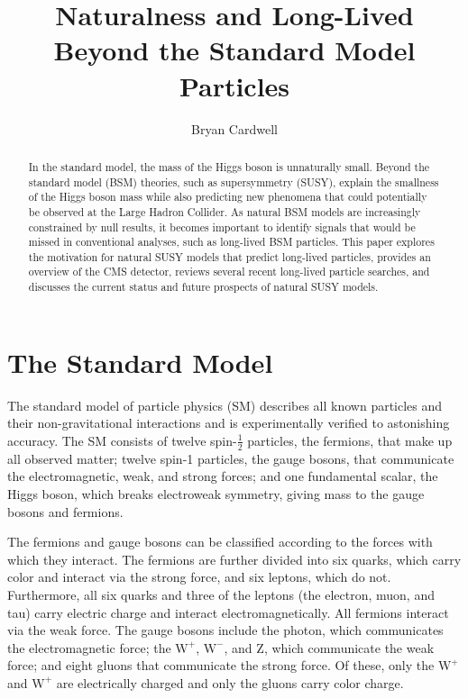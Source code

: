 \documentclass[12pt]{article}
\title{Naturalness and Long-Lived Beyond the Standard Model Particles}
\author{Bryan Cardwell}
\begin{document}
\singlespacing
\maketitle

\begin{abstract}
    In the standard model, the mass of the Higgs boson is unnaturally small. Beyond the standard model (BSM) theories, such as supersymmetry (SUSY), explain the smallness of the Higgs boson mass while also predicting new phenomena that could potentially be observed at the Large Hadron Collider. As natural BSM models are increasingly constrained by null results, it becomes important to identify signals that would be missed in conventional analyses, such as long-lived BSM particles. This paper explores the motivation for natural SUSY models that predict long-lived particles, provides an overview of the CMS detector, reviews several recent long-lived particle searches, and discusses the current status and future prospects of natural SUSY models.

\end{abstract}

\newpage
\tableofcontents
\newpage
\doublespacing
{}

\section{The Standard Model} \label{SM}
    The standard model of particle physics (SM) describes all known particles and their non-gravitational interactions and is experimentally verified to astonishing accuracy. The SM consists of twelve spin-$\frac{1}{2}$ particles, the fermions, that make up all observed matter; twelve spin-1 particles, the gauge bosons, that communicate the electromagnetic, weak, and strong forces; and one fundamental scalar, the Higgs boson, which breaks electroweak symmetry, giving mass to the gauge bosons and fermions.

    The fermions and gauge bosons can be classified according to the forces with which they interact. The fermions are further divided into six quarks, which carry color and interact via the strong force, and six leptons, which do not. Furthermore, all six quarks and three of the leptons (the electron, muon, and tau) carry electric charge and interact electromagnetically. All fermions interact via the weak force. The gauge bosons include the photon, which communicates the electromagnetic force; the $\mathrm{W}^+$, $\mathrm{W}^-$, and $\mathrm{Z}$, which communicate the weak force; and eight gluons that communicate the strong force. Of these, only the $\mathrm{W}^+$ and $\mathrm{W}^+$ are electrically charged and only the gluons carry color charge.
\end{document}
